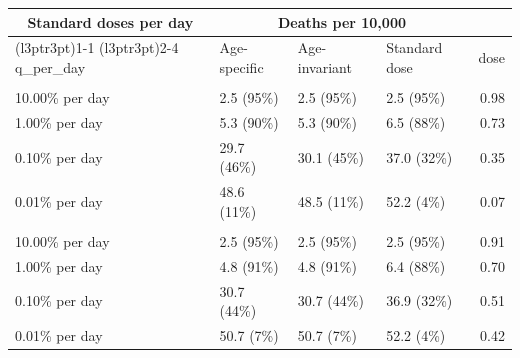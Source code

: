 
\begin{tabular}{llllr}
\toprule
\multicolumn{1}{c}{Standard doses per day} & \multicolumn{3}{c}{Deaths per 10,000} \\
\cmidrule(l{3pt}r{3pt}){1-1} \cmidrule(l{3pt}r{3pt}){2-4}
q\_per\_day & Age-specific & Age-invariant & Standard dose & dose\\
\midrule
\addlinespace[0.3em]
\multicolumn{5}{l}{\textbf{Concave dose-response}}\\
\hspace{1em}10.00\% per day & 2.5 (95\%) & 2.5 (95\%) & 2.5 (95\%) & 0.98\\
\hspace{1em}1.00\% per day & 5.3 (90\%) & 5.3 (90\%) & 6.5 (88\%) & 0.73\\
\hspace{1em}0.10\% per day & 29.7 (46\%) & 30.1 (45\%) & 37.0 (32\%) & 0.35\\
\hspace{1em}0.01\% per day & 48.6 (11\%) & 48.5 (11\%) & 52.2 (4\%) & 0.07\\
\addlinespace[0.3em]
\multicolumn{5}{l}{\textbf{Sigmoid dose-response}}\\
\hspace{1em}10.00\% per day & 2.5 (95\%) & 2.5 (95\%) & 2.5 (95\%) & 0.91\\
\hspace{1em}1.00\% per day & 4.8 (91\%) & 4.8 (91\%) & 6.4 (88\%) & 0.70\\
\hspace{1em}0.10\% per day & 30.7 (44\%) & 30.7 (44\%) & 36.9 (32\%) & 0.51\\
\hspace{1em}0.01\% per day & 50.7 (7\%) & 50.7 (7\%) & 52.2 (4\%) & 0.42\\
\bottomrule
\end{tabular}
